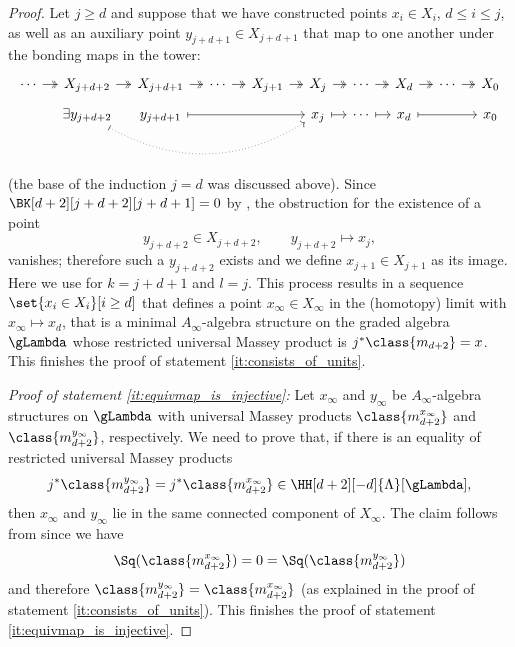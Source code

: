 \documentclass[a4paper]{amsart}
\begin{document}
\begin{proof}
  Let $j\geq d$ and suppose that we have constructed points $x_i\in X_i$, $d\leq
  i\leq j$, as well as an auxiliary point $y_{j+d+1}\in X_{j+d+1}$ that map to
  one another under the bonding maps in the tower:
  \[
    \begin{tikzcd}[column sep=1em, row sep=tiny]
      \cdots\rar[twoheadrightarrow]&X_{j+d+2}\rar[twoheadrightarrow]&X_{j+d+1}\rar[twoheadrightarrow]&\cdots\rar[twoheadrightarrow]&X_{j+1}\rar[twoheadrightarrow]&X_j\rar[twoheadrightarrow]&\cdots\rar[twoheadrightarrow]&X_d\rar[twoheadrightarrow]&\cdots\rar[twoheadrightarrow]&X_0\\
      &\exists y_{j+d+2}\ar[mapsto,dotted,bend
      right]{rrrr}&y_{j+d+1}\ar[mapsto]{rrr}&&&x_j\rar[mapsto]&\cdots\rar[mapsto]&x_d\ar[mapsto]{rr}&&x_0
    \end{tikzcd}
  \]
  (the base of the induction $j=d$ was discussed above). Since
  $\BK[d+2][j+d+2][j+d+1]=0$ by , the obstruction for
  the existence of a point
  \[
    y_{j+d+2}\in X_{j+d+2},\qquad y_{j+d+2}\longmapsto x_j,
  \]
  vanishes; therefore such a $y_{j+d+2}$ exists and we define $x_{j+1}\in
  X_{j+1}$ as its image. Here we use \cite[Prop.~5.4]{Mur20b} for $k=j+d+1$ and
  $l=j$. This process results in a sequence $\set{x_i\in X_i}[i\geq d]$ that
  defines a point $x_\infty\in X_\infty$ in the (homotopy) limit with
  $x_\infty\mapsto x_d$, that is a minimal $A_\infty$-algebra structure on the
  graded algebra $\gLambda$ whose restricted universal Massey product is
  $j^*\class{m_{d+2}}=x$. This finishes the proof of statement
  \eqref{it:consists_of_units}.

  \emph{Proof of statement \eqref{it:equivmap_is_injective}:} Let
  $x_\infty$ and $y_\infty$ be $A_\infty$-algebra structures on $\gLambda$ with
  universal Massey products $\class{m_{d+2}^{x_{\infty}}}$ and
  $\class{m_{d+2}^{y_{\infty}}}$, respectively. We need to prove that, if there
  is an equality of restricted universal Massey products
  \[
    j^*\class{m_{d+2}^{y_{\infty}}}=j^*\class{m_{d+2}^{x_{\infty}}}\in\HH[d+2][-d]{\Lambda}[\gLambda],
  \]
  then $x_\infty$ and $y_{\infty}$ lie in the same connected component of
  $X_\infty$. The claim follows from  since we
  have
  \[
    \Sq(\class{m_{d+2}^{x_{\infty}}})=0=\Sq(\class{m_{d+2}^{y_\infty}})
  \]
  and therefore $\class{m_{d+2}^{y_\infty}}=\class{m_{d+2}^{x_\infty}}$ (as
  explained in the proof of statement \eqref{it:consists_of_units}). This
  finishes the proof of statement \eqref{it:equivmap_is_injective}.
\end{proof}
\end{document}
